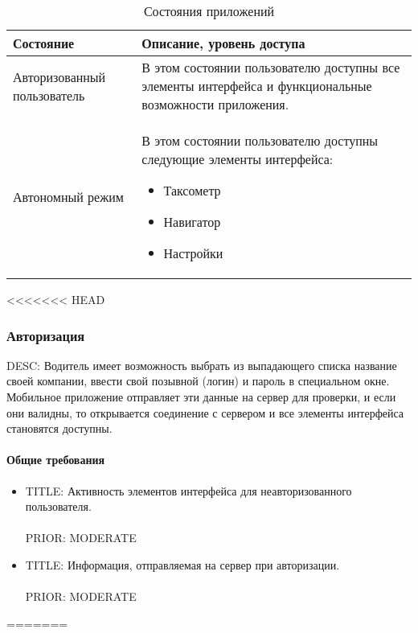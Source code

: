              \begin{table}
             \begin{center}
             \caption {Состояния приложений}
             \label{app_state}
             \setlength{\extrarowheight}{2mm}
             \begin{tabular}{|p{5cm}|p{10cm}|}
                 \hline     \textbf{Состояние}&\textbf{Описание, уровень доступа} \\ [2mm]

                 \hline   Авторизованный пользователь & В этом состоянии пользователю доступны все элементы интерфейса и функциональные возможности приложения.\\ [2mm]
                 \hline   Автономный режим & В этом состоянии пользователю доступны следующие элементы интерфейса: \begin{itemize} \item Таксометр \item Навигатор \item Настройки \end{itemize}\\ [2mm]
                  \hline
             \end{tabular}
             \end{center}
             \end{table}

<<<<<<< HEAD
  	  \subsubsection{Авторизация}

  		  DESC: Водитель имеет возможность выбрать из выпадающего списка название своей компании, ввести свой позывной (логин) и пароль в специальном окне. Мобильное приложение отправляет эти данные на сервер для проверки, и если они валидны, то открывается соединение с сервером и все элементы интерфейса становятся доступны.

        \paragraph{Общие требования}
          \begin{itemize}
            \item{
              TITLE: Активность элементов интерфейса для неавторизованного пользователя.\\
              \\
              PRIOR: MODERATE\\}

            \item{
              TITLE: Информация, отправляемая на сервер при авторизации.\\
              \\
              PRIOR: MODERATE\\}
          \end{itemize}  		    
=======
